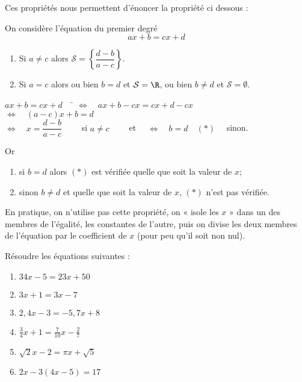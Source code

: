 \documentclass[a4paper,11pt,cours]{nsi}
\begin{document}
Ces propriétés nous permettent d'énoncer la propriété ci dessous :

\begin{propriete}
	
	On considère l'équation du premier degré $$ax+b=cx+d$$
	\begin{enumerate}[label=\textbullet]
		\item Si $a\neq c$ alors $\mathcal{S}=\left\{\dfrac{d-b}{a-c}\right\}$.\\
		
		\item Si $a=c$ alors ou bien $b=d$ et $\mathcal{S}=\R$, ou bien $b\neq d$ et $\mathcal{S}=\emptyset$.
	\end{enumerate}
\end{propriete}


\begin{demonstration}
			\begin{tabbing}
				$ax+b=cx+d\quad$	\=	$\Leftrightarrow\quad ax+b - cx=cx+d-cx$\\
				\>	$\Leftrightarrow\quad (a-c)x+b = d$\\[.5em]
				\>	$\Leftrightarrow\quad x=\dfrac{d-b}{a-c}\qquad$ si $a\neq c\qquad$ et $\quad\Leftrightarrow\quad b=d\quad (*)\quad$ sinon.
			\end{tabbing}
			Or
			\begin{enumerate}[label=\textbullet]
				\item 	si $b=d$ alors $(*)$ est vérifiée quelle que soit la valeur de $x$;
				\item 	sinon $b\neq d$ et quelle que soit la valeur de $x$, $(*)$ n'est pas vérifiée.
			\end{enumerate}
\end{demonstration}	

\begin{remarque}
	En pratique, on n'utilise pas cette propriété, on « isole les $x$ » dans un des membres de l'égalité, les constantes de l'autre, puis on 
	divise les deux membres de l'équation par le coefficient de $x$ (pour peu qu'il soit non nul).
\end{remarque}


\begin {exercice}
Résoudre les équations suivantes :
\begin{multicols}{2}
	\begin{enumerate}
		\item 	$34x-5=23x+50$
		\item 	$3x+1 = 3x -7$
		\item 	$2,4x-3=-5,7x+8$
		\item	$\displaystyle\frac{3}{4}x+1=\frac{7}{10}x-\frac{2}{7}$
		\item 	$\sqrt{2}x-2=\pi x +\sqrt{5}$
		\item	$2x-3(4x-5)=17$
	\end{enumerate}
\end{multicols}
\end {exercice}
\end{document}
